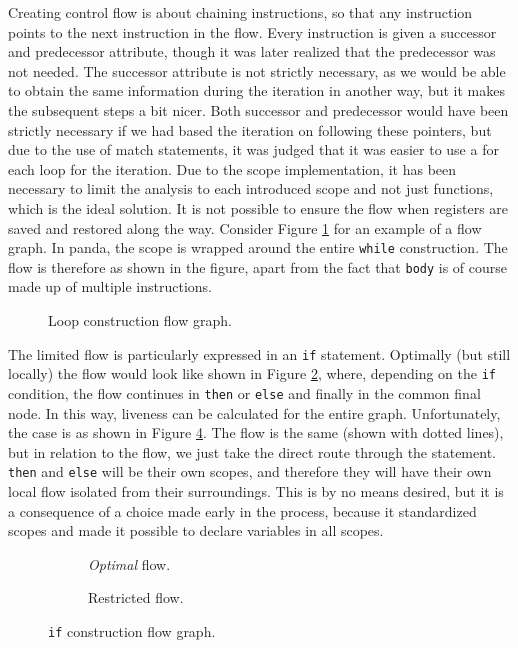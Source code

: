 Creating control flow is about chaining instructions, so that any instruction points to the next instruction in the flow. Every instruction is given a successor and predecessor attribute, though it was later realized that the predecessor was not needed. The successor attribute is not strictly necessary, as we would be able to obtain the same information during the iteration in another way, but it makes the subsequent steps a bit nicer. Both successor and predecessor would have been strictly necessary if we had based the iteration on following these pointers, but due to the use of match statements, it was judged that it was easier to use a for each loop for the iteration. Due to the scope implementation, it has been necessary to limit the analysis to each introduced scope and not just functions, which is the ideal solution. It is not possible to ensure the flow when registers are saved and restored along the way. Consider Figure \ref{fig:flow_while} for an example of a flow graph. In panda, the scope is wrapped around the entire \texttt{while} construction. The flow is therefore as shown in the figure, apart from the fact that \texttt{body} is of course made up of multiple instructions.

\begin{figure}[H]
    \centering
    
    \caption{Loop construction flow graph.}
    \label{fig:flow_while}
\end{figure}

The limited flow is particularly expressed in an \texttt{if} statement. Optimally (but still locally) the flow would look like shown in Figure \ref{fig:if}, where, depending on the \texttt{if} condition, the flow continues in \texttt{then} or \texttt{else} and finally in the common final node. In this way, liveness can be calculated for the entire graph. Unfortunately, the case is as shown in Figure \ref{fig:restriected}. The flow is the same (shown with dotted lines), but in relation to the flow, we just take the direct route through the statement. \texttt{then} and \texttt{else} will be their own scopes, and therefore they will have their own local flow isolated from their surroundings. This is by no means desired, but it is a consequence of a choice made early in the process, because it standardized scopes and made it possible to declare variables in all scopes.

\begin{figure}[H]
    \centering
    \begin{subfigure}{0.49\textwidth}
        \centering
        
        \caption{\textit{Optimal} flow.}
        \label{fig:if}
    \end{subfigure}
    \begin{subfigure}{0.49\textwidth}
        \centering
        
        \caption{Restricted flow.}
        \label{fig:restriected}
    \end{subfigure}
    \caption{\texttt{if} construction flow graph.}
\end{figure}

